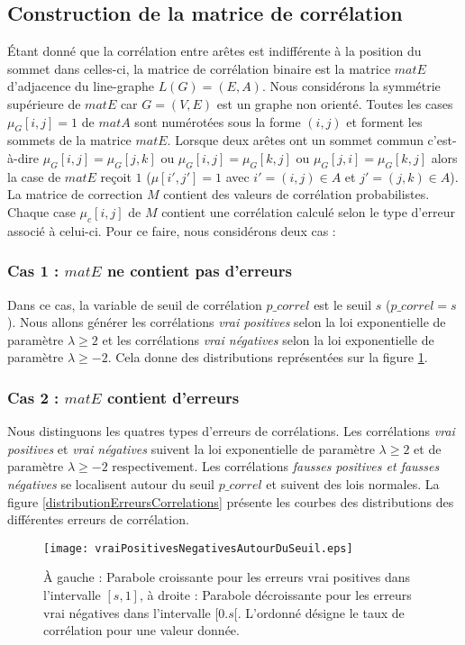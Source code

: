 \documentclass[onecolumn, 12pt]{book}
\begin{document}
\subsection{Construction de la matrice de corr\'elation}
\'Etant donn\'e que la corr\'elation entre ar\^etes est indiff\'erente \`a la position du sommet dans celles-ci, la matrice de corr\'elation binaire est la matrice $matE$ d'adjacence du line-graphe $L(G)= (E, A)$. %
\newline
Nous consid\'erons la symm\'etrie sup\'erieure de $matE$ car $G=(V,E)$ est un graphe non orient\'e. 
Toutes les cases $\mu_G[i,j] = 1$ de $matA$ sont num\'erot\'ees sous la forme $(i,j)$ et forment les sommets de la matrice $matE$. Lorsque deux ar\^etes ont un sommet commun c'est-\`a-dire $\mu_G[i,j]  = \mu_G[j,k] $ ou $\mu_G[i,j]  = \mu_G[k,j]$ ou $\mu_G[j,i]  = \mu_G[k,j] $ alors la case de $matE$ re\c coit $1$ ($\mu[i',j'] = 1$ avec $i' = (i,j) \in A$ et $j' = (j,k) \in A$).
\newline
La matrice de correction $M$ contient des valeurs de corr\'elation probabilistes. 
Chaque case $\mu_c[i,j]$ de $M$ contient une corr\'elation calcul\'e selon  le type d'erreur associ\'e \`a celui-ci. 
Pour ce faire, nous consid\'erons deux cas :
\subsubsection{Cas 1 : $matE$ ne contient pas d'erreurs }
Dans ce cas, la variable de seuil de corr\'elation $p\_correl$ est le seuil $s$ ($p\_correl = s$). 
Nous allons g\'en\'erer les corr\'elations {\em vrai positives}  selon la loi exponentielle de param\`etre $\lambda \ge 2$ et les corr\'elations {\em vrai n\'egatives} selon la loi exponentielle de param\`etre $\lambda \ge -2$. Cela donne des distributions repr\'esent\'ees sur la figure \ref{vraiPositivesNegativesAutourDuSeuil}.
\subsubsection{Cas 2 : $matE$ contient d'erreurs }
Nous distinguons les quatres types d'erreurs de corr\'elations. Les corr\'elations {\em vrai positives} et {\em vrai n\'egatives}  suivent  la loi exponentielle de param\`etre $\lambda \ge 2$ et de param\`etre $\lambda \ge -2$ respectivement. 
Les corr\'elations {\em fausses positives et fausses n\'egatives} se localisent autour du seuil $p\_correl$ et  suivent des lois normales. La figure \ref{distributionErreursCorrelations} pr\'esente les courbes des distributions des  diff\'erentes erreurs de corr\'elation.
\begin{figure}[htb!] 
\centering
\texttt{[image: vraiPositivesNegativesAutourDuSeuil.eps]}
\caption{\`A gauche : Parabole croissante pour les erreurs {vrai positives} dans l'intervalle  $[s,1]$, \`a droite : Parabole d\'ecroissante pour les erreurs {vrai n\'egatives} dans l'intervalle $[0.s[$. L'ordonn\'e d\'esigne le taux de corr\'elation pour une valeur donn\'ee. }
\label{vraiPositivesNegativesAutourDuSeuil} 
\end{figure}
\end{document}
